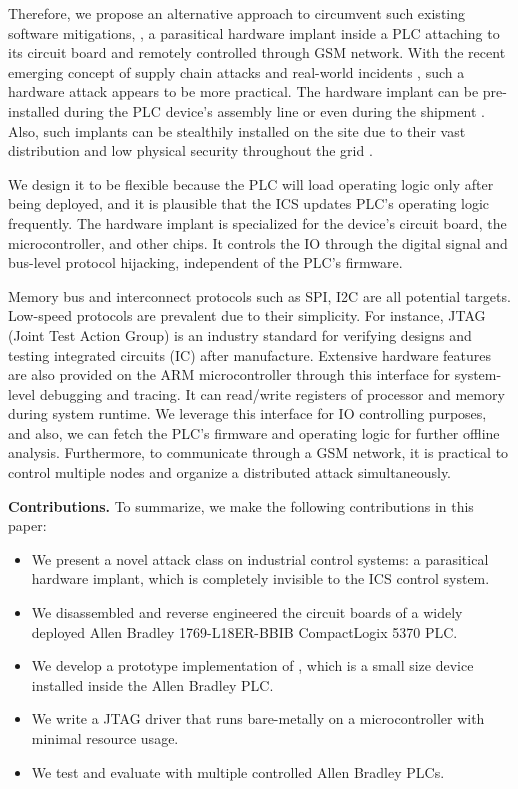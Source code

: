 
Therefore, we propose an alternative approach to circumvent such existing software mitigations, \name, a parasitical hardware implant inside a PLC attaching to its circuit board and remotely controlled through GSM network.  With the recent emerging concept of supply chain attacks and real-world incidents \cite{oxfordsolarwinds}, such a hardware attack appears to be more practical. The hardware implant can be pre-installed during the PLC device's assembly line or even during the shipment \cite{robertson2018big}. Also, such implants can be stealthily installed on the site due to their vast distribution and low physical security throughout the grid \cite{Loopholes2020}.

We design it to be flexible because the PLC will load operating logic only after being deployed, and it is plausible that the ICS updates PLC's operating logic frequently. The hardware implant is specialized for the device's circuit board, the microcontroller, and other chips.  It controls the IO through the digital signal and bus-level protocol hijacking, independent of the PLC's firmware.

Memory bus and interconnect protocols such as SPI, I2C are all potential targets. Low-speed protocols are prevalent due to their simplicity. For instance, JTAG (Joint Test Action Group) is an industry standard for verifying designs and testing integrated circuits (IC) after manufacture. Extensive hardware features are also provided on the ARM microcontroller through this interface for system-level debugging and tracing. It can read/write registers of processor and memory during system runtime. We leverage this interface for IO controlling purposes, and also, we can fetch the PLC's firmware and operating logic for further offline analysis. Furthermore, to communicate through a GSM network, it is practical to control multiple nodes and organize a distributed attack simultaneously.



\textbf{Contributions.} To summarize, we make the following contributions in this paper:
\begin{itemize}[leftmargin=*]
	\item We present a novel attack class on industrial control systems: a parasitical hardware implant, which is completely invisible to the ICS control system.
	\item We disassembled and reverse engineered the circuit boards of a widely deployed Allen Bradley 1769-L18ER-BBIB CompactLogix 5370 PLC. 
	\item We develop a prototype implementation of \name, which is a small size device installed inside the Allen Bradley PLC. 
	\item We write a JTAG driver that runs bare-metally on a microcontroller with minimal resource usage.
	\item We test and evaluate \name with multiple controlled Allen Bradley PLCs. 
\end{itemize}

